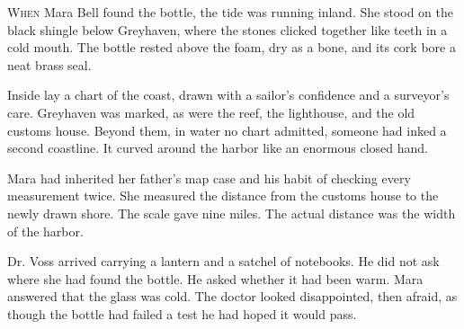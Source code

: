 \lettrine[lines=3,loversize=0.12]{W}{hen} Mara Bell found the bottle, the
tide was running inland. She stood on the black shingle below Greyhaven,
where the stones clicked together like teeth in a cold mouth. The bottle
rested above the foam, dry as a bone, and its cork bore a neat brass seal.

Inside lay a chart of the coast, drawn with a sailor's confidence and a
surveyor's care. Greyhaven was marked, as were the reef, the lighthouse, and
the old customs house. Beyond them, in water no chart admitted, someone had
inked a second coastline. It curved around the harbor like an enormous
closed hand.

Mara had inherited her father's map case and his habit of checking every
measurement twice. She measured the distance from the customs house to the
newly drawn shore. The scale gave nine miles. The actual distance was the
width of the harbor.

Dr. Voss arrived carrying a lantern and a satchel of notebooks. He did not
ask where she had found the bottle. He asked whether it had been warm.
Mara answered that the glass was cold. The doctor looked disappointed, then
afraid, as though the bottle had failed a test he had hoped it would pass.
